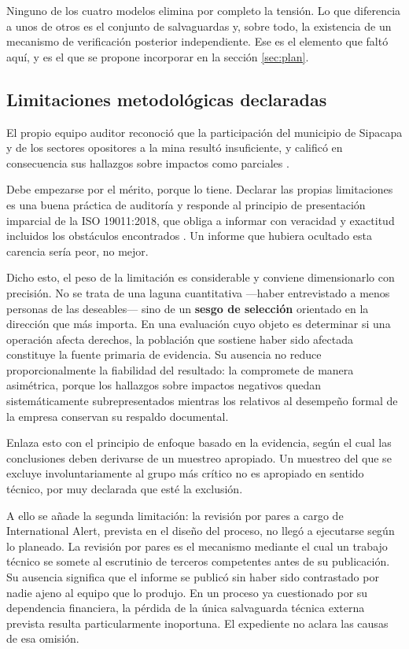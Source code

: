 Ninguno de los cuatro modelos elimina por completo la tensión. Lo que diferencia a
unos de otros es el conjunto de salvaguardas y, sobre todo, la existencia de un
mecanismo de verificación posterior independiente. Ese es el elemento que faltó
aquí, y es el que se propone incorporar en la sección \ref{sec:plan}.

\subsection{Limitaciones metodológicas declaradas}

El propio equipo auditor reconoció que la participación del municipio de Sipacapa
y de los sectores opositores a la mina resultó insuficiente, y calificó en
consecuencia sus hallazgos sobre impactos como parciales
\parencite{oncommonground2010hria}.

Debe empezarse por el mérito, porque lo tiene. Declarar las propias limitaciones
es una buena práctica de auditoría y responde al principio de presentación
imparcial de la ISO 19011:2018, que obliga a informar con veracidad y exactitud
incluidos los obstáculos encontrados \parencite{iso2018iso19011}. Un informe que
hubiera ocultado esta carencia sería peor, no mejor.

Dicho esto, el peso de la limitación es considerable y conviene dimensionarlo con
precisión. No se trata de una laguna cuantitativa —haber entrevistado a menos
personas de las deseables— sino de un \textbf{sesgo de selección} orientado en la
dirección que más importa. En una evaluación cuyo objeto es determinar si una
operación afecta derechos, la población que sostiene haber sido afectada
constituye la fuente primaria de evidencia. Su ausencia no reduce
proporcionalmente la fiabilidad del resultado: la compromete de manera asimétrica,
porque los hallazgos sobre impactos negativos quedan sistemáticamente
subrepresentados mientras los relativos al desempeño formal de la empresa
conservan su respaldo documental.

Enlaza esto con el principio de enfoque basado en la evidencia, según el cual las
conclusiones deben derivarse de un muestreo apropiado. Un muestreo del que se
excluye involuntariamente al grupo más crítico no es apropiado en sentido técnico,
por muy declarada que esté la exclusión.

A ello se añade la segunda limitación: la revisión por pares a cargo de
International Alert, prevista en el diseño del proceso, no llegó a ejecutarse
según lo planeado. La revisión por pares es el mecanismo mediante el cual un
trabajo técnico se somete al escrutinio de terceros competentes antes de su
publicación. Su ausencia significa que el informe se publicó sin haber sido
contrastado por nadie ajeno al equipo que lo produjo. En un proceso ya
cuestionado por su dependencia financiera, la pérdida de la única salvaguarda
técnica externa prevista resulta particularmente inoportuna. El expediente no
aclara las causas de esa omisión.

